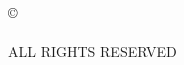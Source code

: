 \clearpage
\thispagestyle{plain}
\null
\vfill
\begin{center}
\copyright\ \CopyrightYear\\
\ThesisAuthor\\
ALL RIGHTS RESERVED
\end{center}
\vfill
\null

